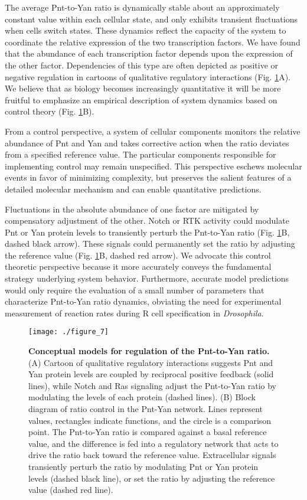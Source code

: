The average Pnt-to-Yan ratio is dynamically stable about an approximately constant value within each cellular state, and only exhibits transient fluctuations when cells switch states. These dynamics reflect the capacity of the system to coordinate the relative expression of the two transcription factors. We have found that the abundance of each transcription factor depends upon the expression of the other factor. Dependencies of this type are often depicted as positive or negative regulation in cartoons of qualitative regulatory interactions (Fig. \ref{fig:ratio:fig7}A). We believe that as biology becomes increasingly quantitative it will be more fruitful to emphasize an empirical description of system dynamics based on control theory (Fig. \ref{fig:ratio:fig7}B).

From a control perspective, a system of cellular components monitors the relative abundance of Pnt and Yan and takes corrective action when the ratio deviates from a specified reference value. The particular components responsible for implementing control may remain unspecified. This perspective eschews molecular events in favor of minimizing complexity, but preserves the salient features of a detailed molecular mechanism and can enable quantitative predictions.

Fluctuations in the absolute abundance of one factor are mitigated by compensatory adjustment of the other. Notch or RTK activity could modulate Pnt or Yan protein levels to transiently perturb the Pnt-to-Yan ratio (Fig. \ref{fig:ratio:fig7}B, dashed black arrow). These signals could permanently set the ratio by adjusting the reference value (Fig. \ref{fig:ratio:fig7}B, dashed red arrow). We advocate this control theoretic perspective because it more accurately conveys the fundamental strategy underlying system behavior. Furthermore, accurate model predictions would only require the evaluation of a small number of parameters that characterize Pnt-to-Yan ratio dynamics, obviating the need for experimental measurement of reaction rates during R cell specification in \textit{Drosophila}.

\begin{figure}[h!]
\centering
\texttt{[image: ./figure\_7]}
\caption[Conceptual models for regulation of the Pnt-to-Yan ratio.]{\textbf{Conceptual models for regulation of the Pnt-to-Yan ratio.} (A) Cartoon of qualitative regulatory interactions suggests Pnt and Yan protein levels are coupled by reciprocal positive feedback (solid lines), while Notch and Ras signaling adjust the Pnt-to-Yan ratio by modulating the levels of each protein (dashed lines). (B) Block diagram of ratio control in the Pnt-Yan network. Lines represent values, rectangles indicate functions, and the circle is a comparison point. The Pnt-to-Yan ratio is compared against a basal reference value, and the difference is fed into a regulatory network that acts to drive the ratio back toward the reference value. Extracellular signals transiently perturb the ratio by modulating Pnt or Yan protein levels (dashed black line), or set the ratio by adjusting the reference value (dashed red line).}
\label{fig:ratio:fig7}
\end{figure}

